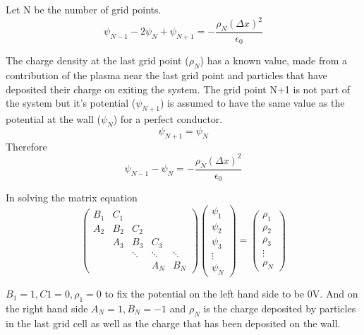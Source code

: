 \documentclass[12pt]{article}
\def\be{\begin{equation}}
\def\ee{\end{equation}}
\begin{document}
 
Let N be the number of grid points. 
\be
\psi_{N-1} -2\psi_N + \psi_{N+1}  = - \frac{\rho_N (\Delta x)^2}{\epsilon_0}
\ee 


The charge density at the last grid point ($\rho_N$) has a known value, made from a contribution of the plasma near the last grid point and particles that have deposited their charge on exiting the system. The grid point N+1 is not part of the system but it's potential
($\psi_{N+1}$)   is assumed to have the same value as the potential at the wall ($\psi_{N}$) for a perfect conductor. 
\be 
\psi_{N+1} = \psi_{N}
\ee 
Therefore 
\be
\psi_{N-1} -\psi_N   = - \frac{\rho_N (\Delta x)^2}{\epsilon_0}
\ee 

In solving the matrix equation 
\be
\begin{pmatrix}
  B_{1} & C_{1}  \\
  A_{2} & B_{2} & C_2 \\
        & A_3  & B_3 & C_3   \\
        & & \ddots & \ddots & \ddots \\
        & & &  A_N & B_N
\end{pmatrix}
\begin{pmatrix} 
 \psi_1  \\ 
 \psi_2  \\ 
 \psi_3  \\ 
 \vdots  \\
 \psi_N
\end{pmatrix}
= 
\begin{pmatrix} 
 \rho_1  \\ 
 \rho_2  \\ 
 \rho_3  \\ 
 \vdots  \\
 \rho_N
\end{pmatrix}
\ee         

$B_1=1 ,C1=0 , \rho_1=0$ to fix the potential on the left hand side to be 0V. And on the right hand side
$A_N =1, B_N = -1$ and $\rho_N$ is the charge deposited by particles in the last grid cell as well as the charge that has been deposited on the wall. 
\end{document}
